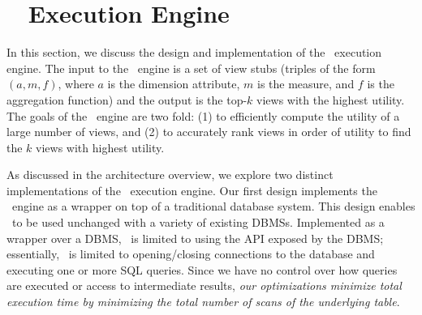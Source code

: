 
\section{{\large \VizRecDB\ } Execution Engine}
In this section, we discuss the design and implementation of the \VizRecDB\
execution engine. 
The input to the \VizRecDB\ engine is a set of view stubs (triples of the form
$(a, m, f)$, where $a$ is the dimension attribute, $m$ is the measure,
and $f$ is the aggregation function) and the output is the top-$k$ views with the highest utility.
The goals of the \VizRecDB\ engine are two fold:
(1) to efficiently compute the utility of a large number of views, and 
(2) to accurately rank views in order of
utility to find the $k$ views with highest utility.


As discussed in the architecture overview, we explore two distinct
implementations of the \VizRecDB\ execution engine.
Our first design implements the \VizRecDB\ engine as a wrapper on top of a
traditional database system.
This design enables \VizRecDB\ to be used unchanged with a variety of
existing DBMSs.
Implemented as a wrapper over a DBMS, \VizRecDB\ is limited to using the API
exposed by the DBMS; essentially, 
\VizRecDB\ is limited to opening/closing connections to the
database and executing one or more SQL queries. 
Since we have no control over how queries are executed or access to intermediate
results, {\it our optimizations minimize total execution time by minimizing the
total number of scans of the underlying table}.

